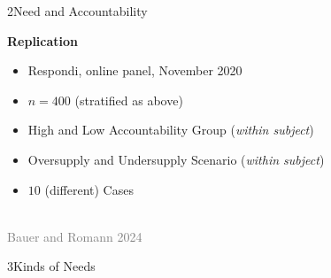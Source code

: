 \documentclass[xcolor=table,9pt,aspectratio=169]{beamer}
\begin{document}
\begin{frame}{\vspace*{10mm}2\hspace*{1em}Need and Accountability}
\begin{multicols}{2}
   \textbf{Replication}\\
   \medskip
   \begin{itemize}
      \item Respondi, online panel, November 2020
      \item $n=400$ (stratified as above)
      \item High and Low Accountability Group (\textit{within subject})
      \item Oversupply and Undersupply Scenario (\textit{within subject})
      \item $10$ (different) Cases
   \end{itemize}
   \vfill
   \begin{center}
      \\
      \textcolor{gray}{Bauer and Romann 2024}
   \end{center}
\end{multicols}
\end{frame}


\begin{frame}
\begin{overlayarea}{\textwidth}{0.81\paperheight}{
   \vspace*{11mm}
   \textcolor{uolblue}
   {3\hspace*{1em}Kinds of Needs}
}
\end{overlayarea}
\end{frame}
\end{document}
